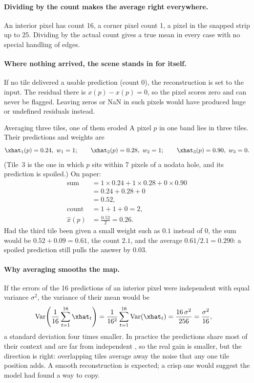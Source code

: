 \paragraph{Dividing by the count makes the average right everywhere.}
An interior pixel has count 16, a corner pixel count 1, a pixel in the snapped strip up to 25. Dividing by
the actual count gives a true mean in every case with no special handling of edges.

\paragraph{Where nothing arrived, the scene stands in for itself.}
If no tile delivered a usable prediction (count $0$), the reconstruction is set to the input. The residual
there is $x(p)-x(p)=0$, so the pixel scores zero and can never be flagged. Leaving zeros or NaN in such
pixels would have produced huge or undefined residuals instead.

\begin{worked}[label={we:inference:avg}]{Averaging three tiles, one of them eroded}
A pixel $p$ in one band lies in three tiles. Their predictions and weights are
\[
\xhat_1(p)=0.24,\ w_1=1;\qquad \xhat_2(p)=0.28,\ w_2=1;\qquad \xhat_3(p)=0.90,\ w_3=0.
\]
(Tile~3 is the one in which $p$ sits within 7 pixels of a nodata hole, and its prediction is spoiled.) On
paper:
\begin{align*}
\text{sum} &= 1\times0.24 + 1\times0.28 + 0\times0.90\\
&= 0.24 + 0.28 + 0\\
&= 0.52,\\
\text{count} &= 1+1+0 = 2,\\
\hat{x}(p) &= \frac{0.52}{2} = 0.26.
\end{align*}
Had the third tile been given a small weight such as $0.1$ instead of $0$, the sum would be
$0.52+0.09=0.61$, the count $2.1$, and the average $0.61/2.1=0.290$: a spoiled prediction still pulls
the answer by $0.03$.
\end{worked}

\paragraph{Why averaging smooths the map.}
If the errors of the 16 predictions of an interior pixel were independent with equal variance $\sigma^2$,
the variance of their mean would be
\begin{align*}
\operatorname{Var}\!\left(\frac{1}{16}\sum_{t=1}^{16}\xhat_t\right)
&= \frac{1}{16^2}\sum_{t=1}^{16}\operatorname{Var}(\xhat_t)
 = \frac{16\,\sigma^2}{256}
 = \frac{\sigma^2}{16},
\end{align*}
a standard deviation four times smaller. In practice the predictions share most of their context and are
far from independent \tagA, so the real gain is smaller, but the direction is right: overlapping tiles
average away the noise that any one tile position adds. A smooth reconstruction is expected; a crisp one
would suggest the model had found a way to copy.


